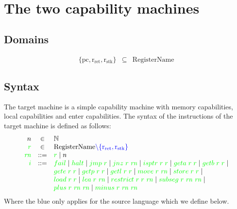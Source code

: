 \documentclass[a4paper]{article}
\newcommand{\sourcecolortext}{blue}
\newcommand{\sourcecolor}[1]{\color{blue}}
\newcommand{\src}[1]{{\sourcecolor{} #1}}
\newcommand{\targetcolor}[1]{\color{green}}
\newcommand{\trg}[1]{{\targetcolor{} #1}}
\newcommand{\zinstr}[1]{#1}
\newcommand{\oneinstr}[2]{
  \ifthenelse{\equal{#2}{}}
  {\zinstr{#1}}
  {\zinstr{#1} \; #2}
}
\newcommand{\twoinstr}[3]{
  \ifthenelse{\equal{#2#3}{}}
  {\zinstr{#1}}
  {\zinstr{#1} \; #2 \; #3}
}
\newcommand{\threeinstr}[4]{
  \ifthenelse{\equal{#2#3#4}{}}
  {\zinstr{#1}}
  {\zinstr{#1} \; #2 \; #3 \; #4}
}
\newcommand{\tfail}{\zinstr{\trg{fail}}}
\newcommand{\thalt}{\zinstr{\trg{halt}}}
\newcommand{\tjmp}[1]{\oneinstr{\trg{jmp}}{#1}}
\newcommand{\tjnz}[2]{\twoinstr{\trg{jnz}}{#1}{#2}}
\newcommand{\tisptr}[2]{\twoinstr{\trg{isptr}}{#1}{#2}}
\newcommand{\tgeta}[2]{\twoinstr{\trg{geta}}{#1}{#2}}
\newcommand{\tgetb}[2]{\twoinstr{\trg{getb}}{#1}{#2}}
\newcommand{\tgete}[2]{\twoinstr{\trg{gete}}{#1}{#2}}
\newcommand{\tgetp}[2]{\twoinstr{\trg{getp}}{#1}{#2}}
\newcommand{\tgetl}[2]{\twoinstr{\trg{getl}}{#1}{#2}}
\newcommand{\tmove}[2]{\twoinstr{\trg{move}}{#1}{#2}}
\newcommand{\tstore}[2]{\twoinstr{\trg{store}}{#1}{#2}}
\newcommand{\tload}[2]{\twoinstr{\trg{load}}{#1}{#2}}
\newcommand{\tlea}[2]{\twoinstr{\trg{lea}}{#1}{#2}}
\newcommand{\trestrict}[3]{\threeinstr{\trg{restrict}}{#1}{#2}{#3}}
\newcommand{\tsubseg}[3]{\threeinstr{\trg{subseg}}{#1}{#2}{#3}}
\newcommand{\tplus}[3]{\threeinstr{\trg{plus}}{#1}{#2}{#3}}
\newcommand{\tminus}[3]{\threeinstr{\trg{minus}}{#1}{#2}{#3}}
\newcommand{\plaindom}[1]{\mathrm{#1}}
\newcommand{\RegName}{\plaindom{RegisterName}}
\newcommand{\nats}{\mathbb{N}}
\newcommand{\var}[1]{\mathit{#1}}
\newcommand{\rn}{\var{rn}}
\newcommand{\pcreg}{\mathrm{pc}}
\newcommand{\rstk}{\mathrm{r}_\mathrm{stk}}
\newcommand{\rO}{\mathrm{r}_\mathrm{ret}}
\begin{document}
\section{The two capability machines}
\subsection{Domains}
\[
  \begin{array}{rcl}
    \{\pcreg,\rO,\rstk \} & \subseteq & \RegName
  \end{array}
\]

\subsection{Syntax}
The target machine is a simple capability machine with memory capabilities, local capabilities and enter capabilities. The syntax of the instructions of the target machine is defined as follows:
\[
\begin{array}{rcl}
n &\in & \nats \\
\trg{r} &\in &  \RegName  \src{\setminus \{\rO,\rstk\}}\\
\trg{\rn} &::= &  \trg{r} \mid n \\
\trg{i} &::= & \tfail \mid \thalt \mid \tjmp{\trg{r}} \mid \tjnz{\trg{r}}{\trg{\rn}} \mid \tisptr{\trg{r}}{\trg{r}} \mid \tgeta{\trg{r}}{\trg{r}} \mid \tgetb{\trg{r}}{\trg{r}} \mid \\
      & &  \tgete{\trg{r}}{\trg{r}}\mid \tgetp{\trg{r}}{\trg{r}} \mid \tgetl{\trg{r}}{\trg{r}} \mid \tmove{\trg{r}}{\trg{\rn}} \mid \tstore{\trg{r}}{\trg{r}} \mid\\
      & &  \tload{\trg{r}}{\trg{r}} \mid \tlea{\trg{r}}{\trg{\rn}} \mid \trestrict{\trg{r}}{\trg{r}}{\trg{\rn}} \mid \tsubseg{\trg{r}}{\trg{\rn}}{\trg{\rn}} \mid \\
      & & \tplus{\trg{r}}{\trg{\rn}}{\trg{\rn}} \mid \tminus{\trg{r}}{\trg{\rn}}{\trg{\rn}}
\end{array}
\]
Where the \sourcecolortext{} only applies for the source language which we define below.
\end{document}
